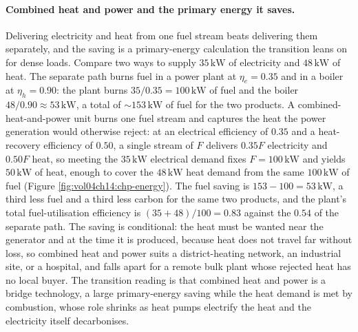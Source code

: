 \paragraph{Combined heat and power and the primary energy it saves.}
Delivering electricity and heat from one fuel stream beats delivering them
separately, and the saving is a primary-energy calculation the transition
leans on for dense loads. Compare two ways to supply $35\,\si{\kilo\watt}$ of
electricity and $48\,\si{\kilo\watt}$ of heat. The separate path burns fuel in
a power plant at $\eta_e = 0.35$ and in a boiler at $\eta_h = 0.90$: the plant
burns $35/0.35 = 100\,\si{\kilo\watt}$ of fuel and the boiler
$48/0.90 \approx 53\,\si{\kilo\watt}$, a total of $\sim 153\,\si{\kilo\watt}$
of fuel for the two products. A combined-heat-and-power unit burns one fuel
stream and captures the heat the power generation would otherwise reject: at an
electrical efficiency of $0.35$ and a heat-recovery efficiency of $0.50$, a
single stream of $F$ delivers $0.35F$ electricity and $0.50F$ heat, so meeting
the $35\,\si{\kilo\watt}$ electrical demand fixes $F = 100\,\si{\kilo\watt}$
and yields $50\,\si{\kilo\watt}$ of heat, enough to cover the
$48\,\si{\kilo\watt}$ heat demand from the same $100\,\si{\kilo\watt}$ of fuel
(Figure \ref{fig:vol04ch14:chp-energy}). The fuel saving is $153 - 100 =
53\,\si{\kilo\watt}$, a third less fuel and a third less carbon for the same
two products, and the plant's total fuel-utilisation efficiency is
$(35 + 48)/100 = 0.83$ against the $0.54$ of the separate path. The saving is
conditional: the heat must be wanted near the generator and at the time it is
produced, because heat does not travel far without loss, so combined heat and
power suits a district-heating network, an industrial site, or a hospital, and
falls apart for a remote bulk plant whose rejected heat has no local buyer. The
transition reading is that combined heat and power is a bridge technology, a
large primary-energy saving while the heat demand is met by combustion, whose
role shrinks as heat pumps electrify the heat and the electricity itself
decarbonises.



